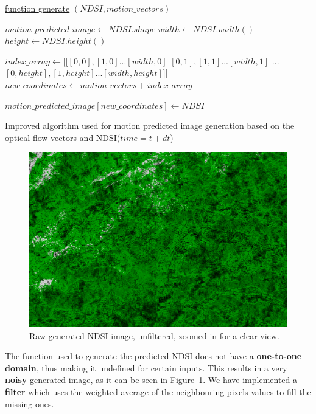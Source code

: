 \documentclass[12pt, a4paper]{report}
\begin{document}
	
	\begin{algorithm}
		
		\underline{function generate} $(NDSI, motion\_vectors)$\;
		
		$motion\_predicted\_image \gets NDSI.shape$\;
		$width \gets NDSI.width()$\;
		$height \gets NDSI.height()$\;
		
		$index\_array \gets [[[0, 0], [1, 0] ... [width, 0]$
		$[0, 1], [1, 1] ... [width, 1]$
		$...$
		$[0, height], [1, height] ... [width, height]]]$\;
		$new\_coordinates \gets motion\_vectors + index\_array$\;
		
		$motion\_predicted\_image[new\_coordinates] \gets NDSI$\;
		
		\;
		
		\caption{Improved algorithm used for motion predicted image generation based on the optical flow vectors and NDSI(\(time=t+dt\))}
		\label{algo:improved_generation}
	\end{algorithm}
	
	\begin{figure}[h!]
		\centering
		\includegraphics[width=\linewidth]{../images/LC81940282015363LGN02_Motion Predicted NDSI_unfiltered_small.png}
		\caption{Raw generated NDSI image, unfiltered, zoomed in for a clear view.}
		\label{fig:unfiltered_small}
	\end{figure}
	
	
	\par The function used to generate the predicted NDSI does not have a \textbf{one-to-one} \textbf{domain}, thus making it undefined for certain inputs. This results in a very \textbf{noisy} generated image, as it can be seen in Figure~\ref{fig:unfiltered_small}. We have implemented a \textbf{filter} which uses the weighted average of the neighbouring pixels values to fill the missing ones.
	
\end{document}
